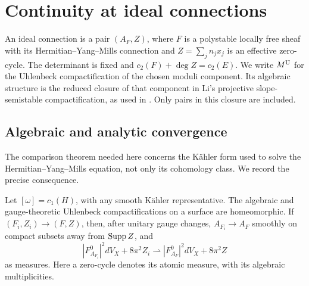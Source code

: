 \section{Continuity at ideal connections}\label{sec:continuity}

An ideal connection is a pair $(A_F,Z)$, where $F$ is a polystable locally
free sheaf with its Hermitian--Yang--Mills connection and
$Z=\sum_jn_jx_j$ is an effective zero-cycle. The determinant is fixed and
$c_2(F)+\deg Z=c_2(E)$.
We write $M^{\mathrm U}$ for the Uhlenbeck compactification of the chosen moduli
component. Its algebraic structure is the reduced closure of that component
in Li's projective slope-semistable compactification, as used in
\cite[Section~7]{Taj23}. Only pairs in this closure are included.

\subsection{Algebraic and analytic convergence}
The comparison theorem needed here concerns the K\"ahler form used to solve
the Hermitian--Yang--Mills equation, not only its cohomology class.
We record the precise consequence.

\begin{lemma}\label{rec:comparison}
Let $[\omega]=c_1(H)$, with any smooth K\"ahler representative.
The algebraic and gauge-theoretic Uhlenbeck compactifications on a surface
are homeomorphic. If $(F_i,Z_i)\to(F,Z)$, then, after unitary gauge changes,
$A_{F_i}\to A_F$ smoothly on compact subsets away from $\operatorname{Supp} Z$, and
\begin{equation}\label{eq:energy-convergence}
 |F_{A_{F_i}}^0|^2dV_X+8\pi^2 Z_i
 \rightharpoonup |F_{A_F}^0|^2dV_X+8\pi^2 Z
\end{equation}
as measures. Here a zero-cycle denotes its atomic measure, with its
algebraic multiplicities.
\end{lemma}

